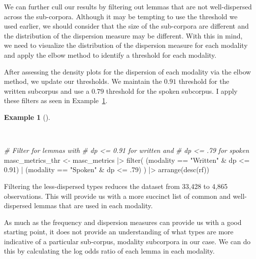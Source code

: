 \documentclass[
  letterpaper,
  krantz1]{latex/krantz-mod}
\newenvironment{Shaded}{\begin{snugshade}}{\end{snugshade}}
\newcommand{\CommentTok}[1]{\textcolor[rgb]{0.00,0.00,0.00}{\textit{#1}}}
\newcommand{\DecValTok}[1]{\textcolor[rgb]{0.00,0.00,0.00}{#1}}
\newcommand{\FloatTok}[1]{\textcolor[rgb]{0.00,0.00,0.00}{#1}}
\newcommand{\FunctionTok}[1]{\textcolor[rgb]{0.00,0.00,0.00}{#1}}
\newcommand{\NormalTok}[1]{\textcolor[rgb]{0.00,0.00,0.00}{#1}}
\newcommand{\OtherTok}[1]{\textcolor[rgb]{0.00,0.00,0.00}{#1}}
\newcommand{\SpecialCharTok}[1]{\textcolor[rgb]{0.00,0.00,0.00}{#1}}
\newcommand{\StringTok}[1]{\textcolor[rgb]{0.00,0.00,0.00}{#1}}
\theoremstyle{definition}
\newtheorem{example}{Example}[chapter]
\theoremstyle{definition}
\theoremstyle{remark}
\begin{document}
We can further cull our results by filtering out lemmas that are not
well-dispersed across the sub-corpora. Although it may be tempting to
use the threshold we used earlier, we should consider that the size of
the sub-corpora are different and the distribution of the dispersion
measure may be different. With this in mind, we need to visualize the
distribution of the dispersion measure for each modality and apply the
elbow method to identify a threshold for each modality.

After assessing the density plots for the dispersion of each modality
via the elbow method, we update our thresholds. We maintain the \(0.91\)
threshold for the written subcorpus and use a \(0.79\) threshold for the
spoken subcorpus. I apply these filters as seen in
Example~\ref{exm-explore-masc-subcorpora-filtered}.

\begin{example}[]\protect\hypertarget{exm-explore-masc-subcorpora-filtered}{}\label{exm-explore-masc-subcorpora-filtered}

~

\begin{Shaded}
\begin{Highlighting}[numbers=left,,]
\CommentTok{\# Filter for lemmas with}
\CommentTok{\# dp \textless{}= 0.91 for written and}
\CommentTok{\# dp \textless{}= .79 for spoken}
\NormalTok{masc\_metrics\_thr }\OtherTok{\textless{}{-}}
\NormalTok{  masc\_metrics }\SpecialCharTok{|\textgreater{}}
  \FunctionTok{filter}\NormalTok{(}
\NormalTok{    (modality }\SpecialCharTok{==} \StringTok{"Written"} \SpecialCharTok{\&}\NormalTok{ dp }\SpecialCharTok{\textless{}=} \FloatTok{0.91}\NormalTok{) }\SpecialCharTok{|}
\NormalTok{    (modality }\SpecialCharTok{==} \StringTok{"Spoken"} \SpecialCharTok{\&}\NormalTok{ dp }\SpecialCharTok{\textless{}=}\NormalTok{ .}\DecValTok{79}\NormalTok{)}
\NormalTok{  ) }\SpecialCharTok{|\textgreater{}}
  \FunctionTok{arrange}\NormalTok{(}\FunctionTok{desc}\NormalTok{(rf))}
\end{Highlighting}
\end{Shaded}

\end{example}

Filtering the less-dispersed types reduces the dataset from 33,428 to
4,865 observations. This will provide us with a more succinct list of
common and well-dispersed lemmas that are used in each modality.

As much as the frequency and dispersion measures can provide us with a
good starting point, it does not provide an understanding of what types
are more indicative of a particular sub-corpus, modality subcorpora in
our case. We can do this by calculating the log odds ratio of each lemma
in each modality.
\end{document}
